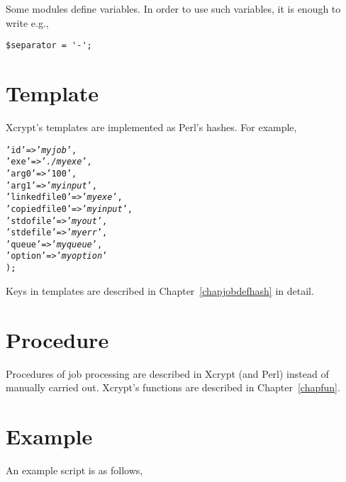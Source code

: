 \documentclass[a4paper,10pt]{report}
\begin{document}
Some modules define variables.
In order to use such variables, it is enough to write e.g.,
\begin{boxnote}
\begin{verbatim}
$separator = '-';
\end{verbatim}
\end{boxnote}

\section{Template}

Xcrypt's templates are implemented as Perl's hashes.  For example,
\begin{boxnote}
\begin{alltt}
%myjob = (
    'id' => '\textit{myjob}',
    'exe' => '\textit{./myexe}',
    'arg0' => '100',
    'arg1' => '\textit{myinput}',
    'linkedfile0' => '\textit{myexe}',
    'copiedfile0' => '\textit{myinput}',
    'stdofile' => '\textit{myout}',
    'stdefile' => '\textit{myerr}',
    'queue' => '\textit{myqueue}',
    'option' => '\textit{myoption}'
);
\end{alltt}
\end{boxnote}
\vspace{\baselineskip}

Keys in templates are described in Chapter~\ref{chapjobdefhash} in
detail.

\section{Procedure}

Procedures of job processing are described in Xcrypt (and Perl)
instead of manually carried out.
Xcrypt's functions are described in Chapter~\ref{chapfun}.

\section{Example}\label{secscriptexample}

An example script is as follows,
\end{document}
